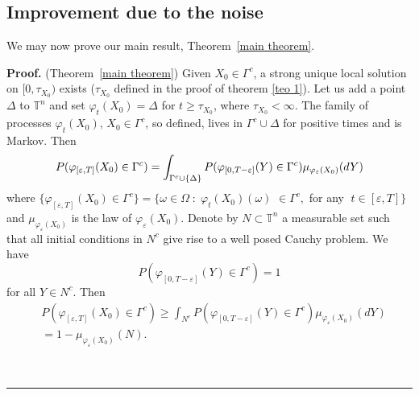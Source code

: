 \documentclass[11pt,a4paper]{article}%
\newenvironment{proof}[1][Proof]{\textbf{#1.} }{\ \rule{0.5em}{0.5em}}
\begin{document}
\subsection{Improvement due to the noise}

We may now prove our main result,
Theorem~\ref{main theorem}.

\begin{proof}  (Theorem~\ref{main theorem})
Given $X_{0}\in\Gamma^{c}$, a strong unique local solution on $[0,\tau_{X_{0}%
})$ exists ($\tau_{X_{0}}$ defined in the proof of theorem \ref{teo 1}). Let
us add a point $\Delta$ to ${\mathbb{T}}^{n}$ and set $\varphi_{t}( X_{0})
=\Delta$ for $t\geq\tau_{X_{0}}$, where $\tau_{X_{0}}<\infty$. The family of
processes $\varphi_{t}( X_{0}) $, $X_{0}\in\Gamma^{c}$, so defined, lives in
$\Gamma^{c}\cup\Delta$ for positive times and is Markov.  Then
\[
P( \varphi_{[ \varepsilon,T] }( X_{0}) \in\Gamma^{c}) \newline=\int
_{\Gamma^{c}\cup\{ \Delta\} }P( \varphi_{[ 0,T-\varepsilon] }( Y) \in
\Gamma^{c}) \mu_{\varphi_{\varepsilon}( X_{0}) }( dY)
\]
where $\{  \varphi_{[ \varepsilon,T] }( X_{0}) \in\Gamma^{c} \}  = \{
\omega\in\Omega\; :\; \varphi_{t} (X_{0})(\omega) $ $\in\Gamma^{c},$ for any
$\; t \in[ \varepsilon,T] \}$ and $\mu_{\varphi_{\varepsilon}( X_{0}) }$ is
the law of $\varphi_{\varepsilon}( X_{0}) $. Denote by $N\subset{\mathbb{T}%
}^{n}$ a measurable set such that all initial conditions in $N^{c}$ give rise
to a well posed Cauchy problem. We have
\[
P( \varphi_{[ 0,T-\varepsilon] }( Y) \in\Gamma^{c}) =1
\]
for all $Y\in N^{c}$. Then%
\begin{align*}
&  P( \varphi_{[ \varepsilon,T] }( X_{0}) \in\Gamma^{c}) \geq\int_{N^{c}}P(
\varphi_{[ 0,T-\varepsilon] }( Y) \in\Gamma^{c}) \mu_{\varphi_{\varepsilon}(
X_{0}) }( dY)\\
&  =1-\mu_{\varphi_{\varepsilon}( X_{0}) }( N) .
\end{align*}



\end{proof}
\end{document}
